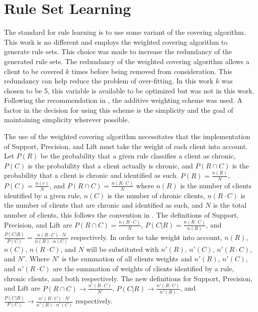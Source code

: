 
\section{Rule Set Learning}\label{chap:algo:weightcov}

The standard for rule learning is to use some variant of the covering algorithm. This work is no different and employs the weighted covering algorithm to generate rule sets. This choice was made to increase the redundancy of the generated rule sets.
The redundancy of the weighted covering algorithm allows a client to be covered $k$ times before being removed from consideration. This redundancy can help reduce the problem of over-fitting. In this work $k$ was chosen to be 5, this variable is available to be optimized but was not in this work. Following the recommendation in \cite{lavrac2004weighted}, the additive weighting scheme was used. A factor in the decision for using this scheme is the simplicity and the goal of maintaining simplicity wherever possible.

The use of the weighted covering algorithm necessitates that the implementation of Support, Precision, and Lift must take the weight of each client into account. Let $P(R)$ be the probability that a given rule classifies a client as chronic, $P(C)$ is the probability that a client actually is chronic, and $P(R \cap C)$ is the probability that a client is chronic and identified as such. $P(R) = \frac{n(R)}{N}$, $P(C) = \frac{n(c)}{N}$, and $P(R \cap C) = \frac{n(R \cdot C)}{N}$ where $n(R)$ is the number of clients identified by a given rule, $n(C)$ is the number of chronic clients, $n(R \cdot C)$ is the number of clients that are chronic and identified as such, and $N$ is the total number of clients, this follows the convention in \cite{lavrac2004weighted}. The definitions of Support, Precision, and Lift are $P(R \cap C) = \frac{n(R \cdot C)}{N}$, $P(C|R) = \frac{n(R \cdot C)}{n(R)}$, and $\frac{P(C|R)}{P(C)} = \frac{n(R \cdot C) \cdot N}{n(R) \cdot n(C)}$ respectively. In order to take weight into account, $n(R)$, $n(C)$, $n(R \cdot C)$, and $N$ will be substituted with $n'(R)$, $n'(C)$, $n'(R \cdot C)$, and $N'$. Where $N'$ is the summation of all clients weights and $n'(R)$, $n'(C)$, and $n'(R \cdot C)$ are the summation of weights of clients identified by a rule, chronic clients, and both respectively. The new definitions for Support, Precision, and Lift are $P(R \cap C) \to \frac{n'(R \cdot C)}{N'}$, $P(C|R) \to \frac{n'(R \cdot C)}{n'(R)}$, and $\frac{P(C|R)}{P(C)} \to \frac{n'(R \cdot C) \cdot N'}{n'(R) \cdot n'(C)}$ respectively.



